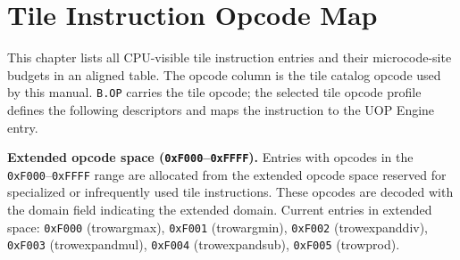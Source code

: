\section{Tile Instruction Opcode Map}
This chapter lists all CPU-visible tile instruction entries and their microcode-site budgets in an aligned table. The opcode column is the tile catalog opcode used by this manual. \texttt{B.OP} carries the tile opcode; the selected tile opcode profile defines the following descriptors and maps the instruction to the UOP Engine entry.

\noindent\textbf{Extended opcode space (\texttt{0xF000}--\texttt{0xFFFF}).} Entries with opcodes in the \texttt{0xF000}--\texttt{0xFFFF} range are allocated from the extended opcode space reserved for specialized or infrequently used tile instructions. These opcodes are decoded with the domain field indicating the extended domain. Current entries in extended space: \texttt{0xF000} (trowargmax), \texttt{0xF001} (trowargmin), \texttt{0xF002} (trowexpanddiv), \texttt{0xF003} (trowexpandmul), \texttt{0xF004} (trowexpandsub), \texttt{0xF005} (trowprod).

